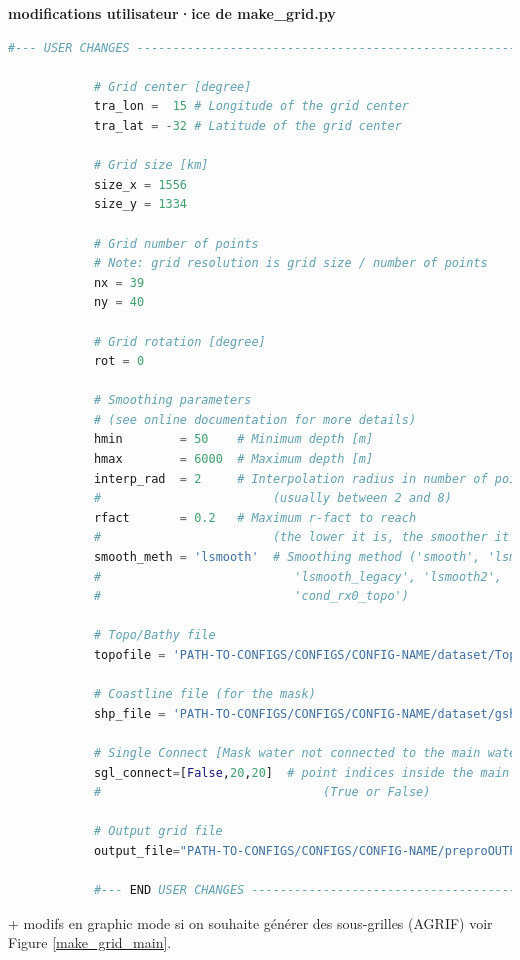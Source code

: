 \documentclass[10pt,a4paper,titlepage]{article}
\begin{document}
    \begin{codeEnv}{\textbf{modifications utilisateur·ice de make\_grid.py}}
        \begin{lstlisting}[language=python]
            #--- USER CHANGES ---------------------------------------------------------
            
            # Grid center [degree]
            tra_lon =  15 # Longitude of the grid center
            tra_lat = -32 # Latitude of the grid center
            
            # Grid size [km]
            size_x = 1556
            size_y = 1334
            
            # Grid number of points
            # Note: grid resolution is grid size / number of points
            nx = 39
            ny = 40
            
            # Grid rotation [degree]
            rot = 0
            
            # Smoothing parameters
            # (see online documentation for more details)
            hmin        = 50    # Minimum depth [m]
            hmax        = 6000  # Maximum depth [m]
            interp_rad  = 2     # Interpolation radius in number of points
            #                        (usually between 2 and 8)
            rfact       = 0.2   # Maximum r-fact to reach
            #                        (the lower it is, the smoother it will be)
            smooth_meth = 'lsmooth'  # Smoothing method ('smooth', 'lsmooth',
            #                           'lsmooth_legacy', 'lsmooth2', 'lsmooth1',
            #                           'cond_rx0_topo')
            
            # Topo/Bathy file
            topofile = 'PATH-TO-CONFIGS/CONFIGS/CONFIG-NAME/dataset/Topo/etopo2.nc'
            
            # Coastline file (for the mask)
            shp_file = 'PATH-TO-CONFIGS/CONFIGS/CONFIG-NAME/dataset/gshhs/GSHHS_i_L1.shp'
            
            # Single Connect [Mask water not connected to the main water body]
            sgl_connect=[False,20,20]  # point indices inside the main water body
            #                               (True or False)
            
            # Output grid file
            output_file="PATH-TO-CONFIGS/CONFIGS/CONFIG-NAME/preproOUTPUT/croco_grd.nc"
            
            #--- END USER CHANGES -----------------------------------------------------
        \end{lstlisting}
    \end{codeEnv}
    + modifs en graphic mode si on souhaite générer des sous-grilles (AGRIF) voir Figure \ref{make_grid_main}.
    
\end{document}
